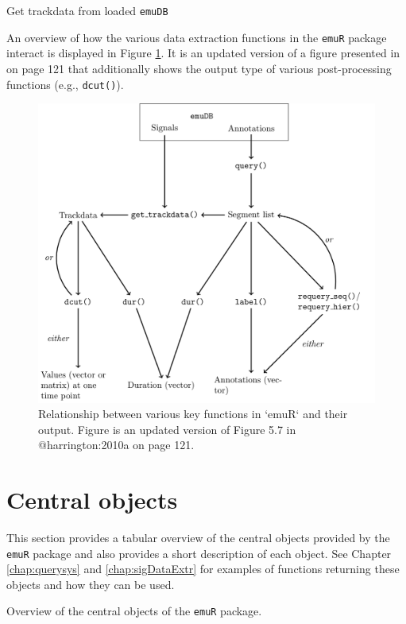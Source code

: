 \documentclass[]{book}
\begin{document}
Get trackdata from loaded \texttt{emuDB}

An overview of how the various data extraction functions in the \texttt{emuR} package interact is displayed in Figure \ref{fig:emuRpackageDetails-dataExtrRel}. It is an updated version of a figure presented in \citet{harrington:2010a} on page 121 that additionally shows the output type of various post-processing functions (e.g., \texttt{dcut()}).

\begin{figure}

{\centering \includegraphics[width=0.75\linewidth]{pics/keyFuncsRel} 

}

\caption{Relationship between various key functions in `emuR` and their output. Figure is an updated version of Figure 5.7 in @harrington:2010a on page 121.}\label{fig:emuRpackageDetails-dataExtrRel}
\end{figure}

\hypertarget{sec:emuRpackageDetails-centralObjects}{%
\section{Central objects}\label{sec:emuRpackageDetails-centralObjects}}

This section provides a tabular overview of the central objects provided by the \texttt{emuR} package and also provides a short description of each object. See Chapter \ref{chap:querysys} and \ref{chap:sigDataExtr} for examples of functions returning these objects and how they can be used.

\label{tab:emuRpackageDetails-centralObjects}Overview of the central objects of the \texttt{emuR} package.
\end{document}
